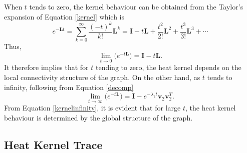 \documentclass[10pt,a4paper]{article}
\theoremstyle{plain}
\theoremstyle{definition}
\begin{document}
        When $t$ tends to zero, the kernel behaviour can be obtained from the Taylor's expansion of  Equation \ref{kernel} which is 
        \begin{equation}
        e^{-\mathbf{L}t} = \sum_{k=0}^{\infty} \frac{(-t)^k}{k!} \mathbf{L}^k = \mathbf{I} -t \mathbf{L} + \frac{ t^2}{2!}\mathbf{L}^2 + \frac{ t^3 }{3!}\mathbf{L}^3 + \cdots
        \end{equation}
        Thus,
        \begin{equation}
        \lim_{t\longrightarrow 0} \Big(e^{-t\mathbf{L}}\Big) = \mathbf{I} - t\mathbf{L}.
        \label{kerneltozero}
        \end{equation}
        It therefore implies that for $t$ tending to zero, the heat kernel depends on the local connectivity structure of the graph.
        On the other hand, as $t$ tends to infinity, following from Equation \ref{decomp}
        \begin{equation}
        \lim_{t\longrightarrow \infty} \Big(e^{-t\mathbf{L}}\Big) = \mathbf{I} - e^{-\lambda_2 t} \mathbf{v}_2 \mathbf{v} _2^T.
        \label{kernelinfinity}  
        \end{equation}
        From Equation \ref{kernelinfinity}, it is evident that for large $t$, the heat kernel behaviour is determined by the global structure of the graph. 
        
        \subsection{Heat Kernel Trace}
        
\end{document}
